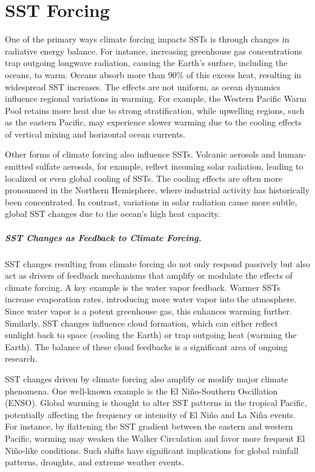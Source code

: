 
\chapter{SST Forcing}

One of the primary ways climate forcing impacts SSTs is through changes in radiative energy balance. For instance, increasing greenhouse gas concentrations trap outgoing longwave radiation, causing the Earth’s surface, including the oceans, to warm. Oceans absorb more than 90\% of this excess heat, resulting in widespread SST increases. The effects are not uniform, as ocean dynamics influence regional variations in warming. For example, the Western Pacific Warm Pool retains more heat due to strong stratification, while upwelling regions, such as the eastern Pacific, may experience slower warming due to the cooling effects of vertical mixing and horizontal ocean currents.

Other forms of climate forcing also influence SSTs. Volcanic aerosols and human-emitted sulfate aerosols, for example, reflect incoming solar radiation, leading to localized or even global cooling of SSTs. The cooling effects are often more pronounced in the Northern Hemisphere, where industrial activity has historically been concentrated. In contrast, variations in solar radiation cause more subtle, global SST changes due to the ocean’s high heat capacity.

\paragraph{SST Changes as Feedback to Climate Forcing.}
SST changes resulting from climate forcing do not only respond passively but also act as drivers of feedback mechanisms that amplify or modulate the effects of climate forcing. A key example is the water vapor feedback. Warmer SSTs increase evaporation rates, introducing more water vapor into the atmosphere. Since water vapor is a potent greenhouse gas, this enhances warming further. Similarly, SST changes influence cloud formation, which can either reflect sunlight back to space (cooling the Earth) or trap outgoing heat (warming the Earth). The balance of these cloud feedbacks is a significant area of ongoing research.


SST changes driven by climate forcing also amplify or modify major climate phenomena. One well-known example is the El Niño-Southern Oscillation (ENSO). Global warming is thought to alter SST patterns in the tropical Pacific, potentially affecting the frequency or intensity of El Niño and La Niña events. For instance, by flattening the SST gradient between the eastern and western Pacific, warming may weaken the Walker Circulation and favor more frequent El Niño-like conditions. Such shifts have significant implications for global rainfall patterns, droughts, and extreme weather events.

